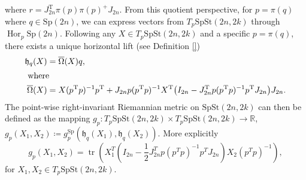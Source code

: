 %
where $r=J_{2n}^{\mathrm{T}}\pi(p)\pi (p)^+J_{2n}$. From this quotient perspective, for $p=\pi(q)$ where $q\in \mathrm{Sp}(2n)$, we can express vectors from $T_{p}\mathrm{SpSt}(2n, 2k)$ through $\operatorname{Hor}_{p}\mathrm{Sp}(2n)$. Following \cite[p.~5]{JensenZimmermann2024} any $X\in T_{p}\mathrm{SpSt}(2n, 2k)$ and a specific $p=\pi (q)$, there exists a unique horizontal lift (see Definition \ref{})
%
\begin{align}
\mathfrak{h}_{q}(X)&=\overline{\Omega}(X)q, \\
\intertext{ where }
\overline{\Omega}(X)&=X(p^{\mathrm{T}}p)^{-1}p^{\mathrm{T}}+J_{2n}p(p^{\mathrm{T}}p)^{-1}X^{\mathrm{T}}\big(I_{2n}-J_{2n}^{\mathrm{T}}p(p^{\mathrm{T}}p)^{-1}p^{\mathrm{T}}J_{2n}\big)J_{2n}.
\end{align}
%
%
%
%
The point-wise right-invariant Riemannian metric on $\mathrm{SpSt}(2n, 2k)$ can then be defined as the mapping $g_{p}\colon T_{p}\mathrm{SpSt}(2n, 2k)\times T_{p}\mathrm{SpSt}(2n, 2k)\xrightarrow{}\mathbb{R}$, $g_{p}(X_{1},X_{2})\coloneqq g^{\mathrm{Sp}}_{p}(\mathfrak{h}_{q}(X_{1}),\mathfrak{h}_{q}(X_{2}))$. More explicitly
\begin{equation}\label{eq:spst_metric}
    g_{p}(X_{1},X_{2})=\operatorname{tr}\left(X_{1}^{T}\left(I_{2n}- \frac{1}{2}J_{2n}^{T}p(p^{T}p)^{-1}p^{T}J_{2n}\right)X_{2}(p^{T}p)^{-1}\right),
\end{equation}
for $X_{1},X_{2}\in T_{p}\mathrm{SpSt}(2n, 2k)$.


